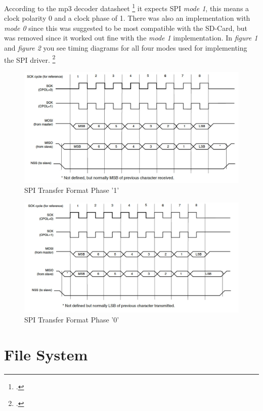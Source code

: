\documentclass[12pt,a4paper,titlepage,oneside]{article}
\begin{document}
According to the mp3 decoder datasheet \footcite[22]{VS1011} it expects SPI {\it mode 1}, this means a clock polarity 0 and a clock phase of 1. There was also an implementation with {\it mode 0} since this was suggested to be most compatible with the SD-Card, but was removed since it worked out fine with the { \it mode 1} implementation. In {\it figure 1} and {\it figure 2} you see timing diagrams for all four modes used for implementing the SPI driver. \footcite[11]{AVRSPI}

\begin{figure}[htbp]
	\includegraphics[width=1.0\textwidth]{ressources/spi_phase_1}
	\caption{SPI Transfer Format Phase '1'}
\end{figure}

\begin{figure}[htbp]
	\includegraphics[width=1.0\textwidth]{ressources/spi_phase_0}
	\caption{SPI Transfer Format Phase '0'}
\end{figure}

\section{File System}
\end{document}
